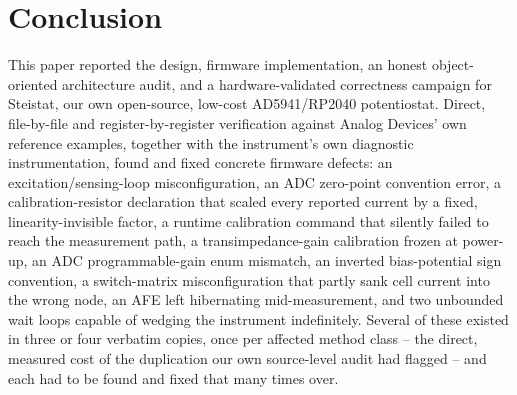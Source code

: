 \section{Conclusion}
\label{sec:conclusion}

This paper reported the design, firmware implementation, an honest
object-oriented architecture audit, and a hardware-validated correctness
campaign for Steistat, our own open-source, low-cost AD5941/RP2040
potentiostat. Direct, file-by-file and register-by-register verification
against Analog Devices' own reference examples, together with the
instrument's own diagnostic instrumentation, found and fixed concrete
firmware defects: an excitation/sensing-loop misconfiguration, an
ADC zero-point convention error, a calibration-resistor declaration that
scaled every reported current by a fixed, linearity-invisible factor, a
runtime calibration command that silently failed to reach the measurement
path, a transimpedance-gain calibration frozen at power-up, an ADC
programmable-gain enum mismatch, an inverted bias-potential sign
convention, a switch-matrix misconfiguration that partly sank cell current
into the wrong node, an AFE left hibernating mid-measurement, and two
unbounded wait loops capable of wedging the instrument indefinitely.
Several of these existed in three or four verbatim copies, once per
affected method class -- the direct, measured cost of the duplication our
own source-level audit had flagged -- and each had to be found and fixed
that many times over.

